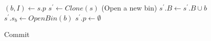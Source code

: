 \begin{algorithm}[H] \label{algo:state_commit}
    \DontPrintSemicolon
    \SetAlgoLined
    $(b, I) \gets s.p$\;
    $s^\prime \gets Clone(s)$\;
    \Else(Open a new bin){
        $s^\prime.B \gets s^\prime.B \cup b$\;
        $s^\prime.s_b \gets OpenBin(b)$\;
    }
    $s^\prime.p \gets \emptyset$\;
    \caption{Commit}
\end{algorithm}